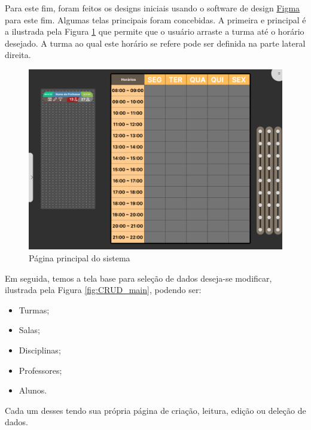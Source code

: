Para este fim, foram feitos os designs iniciais usando o software de design \href{https://www.figma.com/}{Figma} para este fim. Algumas telas principais foram concebidas. A primeira e principal é a ilustrada pela Figura \ref{fig:main} que permite que o usuário arraste a turma até o horário desejado. A turma ao qual este horário se refere pode ser definida na parte lateral direita.

\begin{figure}[htbp]\centering
  \caption{\label{fig:main} Página principal do sistema}
  \includegraphics[scale=0.6]{files/img/Prototipo/Medio/main.png}
\end{figure} %

Em seguida, temos a tela base para seleção de dados deseja-se modificar, ilustrada pela Figura \ref{fig:CRUD_main}, podendo ser:

\begin{itemize}
  \item Turmas;
  \item Salas;
  \item Disciplinas;
  \item Professores;
  \item Alunos.
\end{itemize}


Cada um desses tendo sua própria página de criação, leitura, edição ou deleção de dados.

